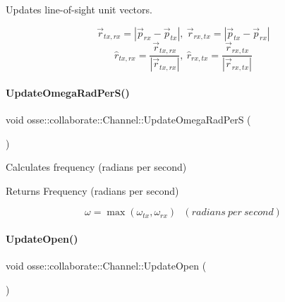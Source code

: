 Updates line-\/of-\/sight unit vectors. 

\[ \vec{r}_{tx,rx} = \left\lvert \vec{p}_{rx} - \vec{p}_{tx} \right\rvert,~ \vec{r}_{rx,tx} = \left\lvert \vec{p}_{tx} - \vec{p}_{rx} \right\rvert \] \[ \hat{r}_{tx,rx} = \frac{\vec{r}_{tx,rx}}{\left\lvert\vec{r}_{tx,rx}\right\rvert},~ \hat{r}_{rx,tx} = \frac{\vec{r}_{rx,tx}}{\left\lvert\vec{r}_{rx,tx}\right\rvert} \] \mbox{\label{classosse_1_1collaborate_1_1_channel_a7e37174d94c0da66432d7b0ace4b2ba4}} 
\paragraph{\texorpdfstring{Update\+Omega\+Rad\+Per\+S()}{UpdateOmegaRadPerS()}}
{\footnotesize\ttfamily void osse\+::collaborate\+::\+Channel\+::\+Update\+Omega\+Rad\+PerS (\begin{DoxyParamCaption}{ }\end{DoxyParamCaption})\hspace{0.3cm}{\ttfamily [private]}}



Calculates frequency (radians per second) 

\begin{DoxyReturn}{Returns}
Frequency (radians per second)
\end{DoxyReturn}
\[ \omega = \max{(\omega_{tx}, \omega_{rx})} ~~~ (radians~per~second) \] \mbox{\label{classosse_1_1collaborate_1_1_channel_a8f419e4573c12ba04b82c023c8f7326f}} 
\paragraph{\texorpdfstring{Update\+Open()}{UpdateOpen()}}
{\footnotesize\ttfamily void osse\+::collaborate\+::\+Channel\+::\+Update\+Open (\begin{DoxyParamCaption}{ }\end{DoxyParamCaption})\hspace{0.3cm}{\ttfamily [private]}}



